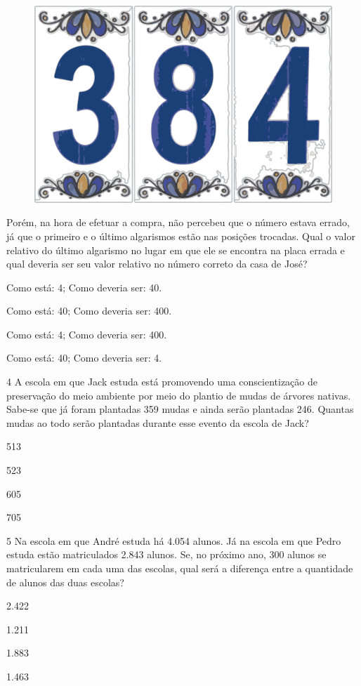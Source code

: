 \begin{figure}[htpb!]
\centering
\includegraphics[width=.3\textwidth]{./media/image92.png}
\end{figure}


Porém, na hora de efetuar a compra, não percebeu que o número estava errado, já que o primeiro e o último algarismos estão nas posições
trocadas. Qual o valor relativo do último algarismo no lugar em que ele se
encontra na placa errada e qual deveria ser seu valor relativo no número correto da casa de José?

\begin{escolha}
\item
  Como está: 4; Como deveria ser: 40.
\item
  Como está: 40; Como deveria ser: 400.
\item
  Como está: 4; Como deveria ser: 400.
\item
  Como está: 40; Como deveria ser: 4.
\end{escolha}


\num{4} A escola em que Jack estuda está promovendo uma conscientização de
preservação do meio ambiente por meio do plantio de mudas de árvores
nativas. Sabe-se que já foram plantadas 359 mudas e ainda serão
plantadas 246. Quantas mudas ao todo serão plantadas durante esse evento
da escola de Jack?

\begin{escolha}
\item
  513
\item
  523
\item
  605
\item
  705
\end{escolha}

\num{5} Na escola em que André estuda há 4.054 alunos. Já na escola em que
Pedro estuda estão matriculados 2.843 alunos. Se, no próximo ano, 300
alunos se matricularem em cada uma das escolas, qual será a diferença
entre a quantidade de alunos das duas escolas?

\begin{escolha}
\item
  2.422
\item
  1.211
\item
  1.883
\item
  1.463
\end{escolha}

